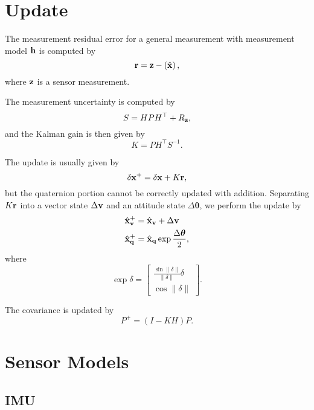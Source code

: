 \documentclass[english]{article}
\begin{document}
\section{Update}

The measurement residual error for a general measurement with measurement model ${\bf h}$ is computed by
\begin{equation}
{\bf r} = {\bf z} - \left(\hat{{\bf x}}\right),
\end{equation}
where ${\bf z}$ is a sensor measurement.

The measurement uncertainty is computed by
\begin{equation}
S = HPH^\top + R_{\bf z},
\end{equation}
and the Kalman gain is then given by
\begin{equation}
K = PH^\top S^{-1}.
\end{equation}

The update is usually given by
\begin{equation}
\delta {\bf x}^+ = \delta {\bf x} + K{\bf r},
\end{equation}
but the quaternion portion cannot be correctly updated with addition. Separating $K{\bf r}$ into a vector state $\Delta{\bf v}$ and an attitude state $\Delta{\boldsymbol \theta}$, we perform the update by
\begin{align}
\hat{{\bf x}}_{\bf v}^+ & = \hat{{\bf x}}_{\bf v} + \Delta{\bf v} \\
\hat{{\bf x}}_{\bf q}^+ & = \hat{{\bf x}}_{\bf q}\exp{\frac{\Delta{\boldsymbol \theta}}{2}},
\end{align}
where
\begin{equation}
\exp{\delta} = \begin{bmatrix} \frac{\sin{\lVert \delta \rVert}}{\lVert \delta \rVert}\delta \\ \cos{\lVert \delta \rVert} \end{bmatrix}.
\end{equation}

The covariance is updated by
\begin{equation}
P^+ = \left( I - KH \right) P.
\end{equation}



\section{Sensor Models}

\subsection{IMU}
\end{document}
